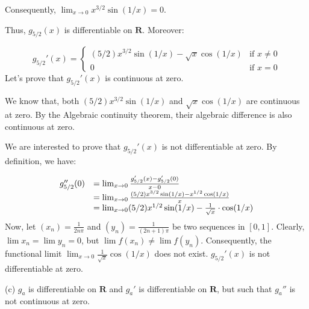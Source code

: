 \documentclass[10pt]{article}
\begin{document}
Consequently, $\displaystyle \lim _{x\rightarrow 0} x^{3/2}\sin( 1/x) =0$.



Thus, $\displaystyle g_{5/2}( x)$ is differentiable on $\displaystyle \mathbf{R}$. Moreover:


\begin{equation*}
g_{5/2} '( x) =\begin{cases}
( 5/2) x^{3/2}\sin( 1/x) -\sqrt{x}\cos( 1/x) & \text{if } x\neq 0\\
0 & \text{if } x=0
\end{cases}
\end{equation*}
Let's prove that $\displaystyle g_{5/2} '( x)$ is continuous at zero.



We know that, both $\displaystyle ( 5/2) x^{3/2}\sin( 1/x)$ and $\displaystyle \sqrt{x}\cos( 1/x)$ are continuous at zero. By the Algebraic continuity theorem, their algebraic difference is also continuous at zero.



We are interested to prove that $\displaystyle g_{5/2} '( x)$ is not differentiable at zero. By definition, we have:


\begin{equation*}
\begin{array}{ c l }
g_{5/2} ''( 0) & =\lim _{x\rightarrow 0}\frac{g_{5/2} '( x) -g_{5/2} '( 0)}{x-0}\\
 & =\lim _{x\rightarrow 0}\frac{( 5/2) x^{3/2}\sin( 1/x) -x^{1/2}\cos( 1/x)}{x}\\
 & =\lim _{x\rightarrow 0}( 5/2) x^{1/2}\sin( 1/x) -\frac{1}{\sqrt{x}} \cdot \cos( 1/x)
\end{array}
\end{equation*}
Now, let $\displaystyle ( x_{n}) =\frac{1}{2n\pi }$ and $\displaystyle ( y_{n}) =\frac{1}{( 2n+1) \pi }$ be two sequences in $\displaystyle [ 0,1]$. Clearly, $\displaystyle \lim x_{n} =\lim y_{n} =0$, but $\displaystyle \lim f( x_{n}) \neq \lim f( y_{n})$. Consequently, the functional limit $\displaystyle \lim _{x\rightarrow 0}\frac{1}{\sqrt{x}}\cos( 1/x)$ does not exist. $\displaystyle g_{5/2} '( x)$ is not differentiable at zero.



(c) $\displaystyle g_{a}$ is differentiable on $\displaystyle \mathbf{R}$ and $\displaystyle g_{a} '$ is differentiable on $\displaystyle \mathbf{R}$, but such that $\displaystyle g_{a} ''$ is not continuous at zero.
\end{document}
